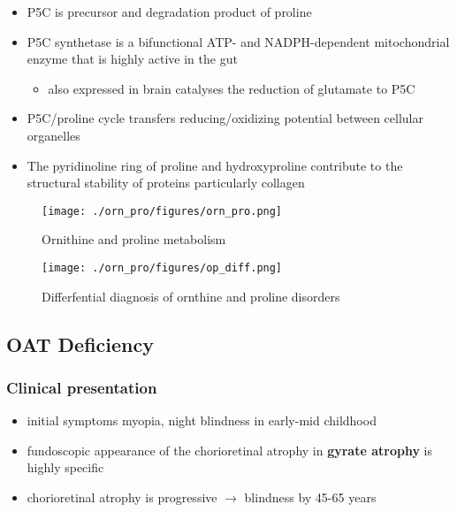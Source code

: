 \documentclass{scrartcl}
\begin{document}
\begin{itemize}
\begin{itemize}
\item {}
\end{itemize}
\item P5C is precursor and degradation product of proline
\item P5C synthetase is a bifunctional ATP- and NADPH-dependent
mitochondrial enzyme that is highly active in the gut
\begin{itemize}
\item also expressed in brain catalyses the reduction of glutamate to
P5C
\end{itemize}
\item P5C/proline cycle transfers reducing/oxidizing potential between
cellular organelles
\item The pyridinoline ring of proline and hydroxyproline contribute to
the structural stability of proteins particularly collagen
\end{itemize}

\begin{figure}[htbp]
\centering
\texttt{[image: ./orn\_pro/figures/orn\_pro.png]}
\caption{\label{fig:orgb1ce98e}
Ornithine and proline metabolism}
\end{figure}

\begin{figure}[htbp]
\centering
\texttt{[image: ./orn\_pro/figures/op\_diff.png]}
\caption{\label{fig:orgc2f7c9a}
Differfential diagnosis of ornthine and proline disorders}
\end{figure}

\subsection{OAT Deficiency}
\label{sec:org254f1fb}
\subsubsection{Clinical presentation}
\label{sec:orgc8dec5f}
\begin{itemize}
\item initial symptoms myopia, night blindness in early-mid childhood
\item fundoscopic appearance of the chorioretinal atrophy in \textbf{gyrate atrophy} is highly specific
\item chorioretinal atrophy is progressive \(\to\) blindness by 45-65 years
\end{itemize}
\end{document}
